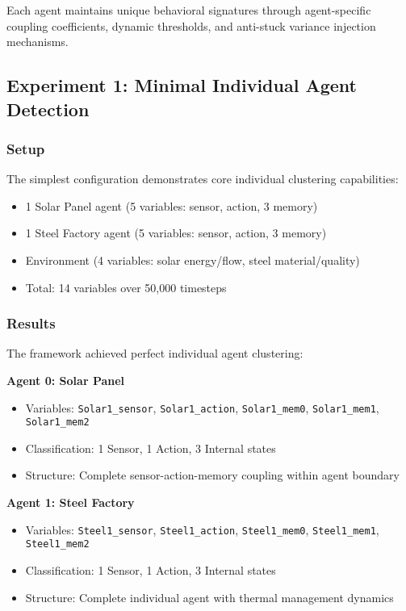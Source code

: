 \documentclass[10pt,conference]{IEEEtran}
\begin{document}
Each agent maintains unique behavioral signatures through agent-specific coupling coefficients, dynamic thresholds, and anti-stuck variance injection mechanisms.

\subsection{Experiment 1: Minimal Individual Agent Detection}

\subsubsection{Setup}
The simplest configuration demonstrates core individual clustering capabilities:
\begin{itemize}
  \item 1 Solar Panel agent (5 variables: sensor, action, 3 memory)
  \item 1 Steel Factory agent (5 variables: sensor, action, 3 memory)  
  \item Environment (4 variables: solar energy/flow, steel material/quality)
  \item Total: 14 variables over 50,000 timesteps
\end{itemize}

\subsubsection{Results}
The framework achieved perfect individual agent clustering:

\textbf{Agent 0: Solar Panel}
\begin{itemize}
  \item Variables: \texttt{Solar1\_sensor}, \texttt{Solar1\_action}, \texttt{Solar1\_mem0}, \texttt{Solar1\_mem1}, \texttt{Solar1\_mem2}
  \item Classification: 1 Sensor, 1 Action, 3 Internal states
  \item Structure: Complete sensor-action-memory coupling within agent boundary
\end{itemize}

\textbf{Agent 1: Steel Factory}
\begin{itemize}
  \item Variables: \texttt{Steel1\_sensor}, \texttt{Steel1\_action}, \texttt{Steel1\_mem0}, \texttt{Steel1\_mem1}, \texttt{Steel1\_mem2}
  \item Classification: 1 Sensor, 1 Action, 3 Internal states
  \item Structure: Complete individual agent with thermal management dynamics
\end{itemize}
\end{document}

